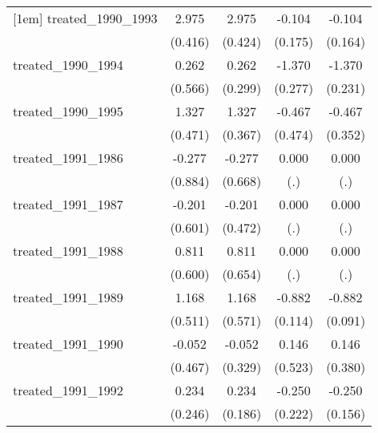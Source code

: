 {\begin{tabular}{l*{4}{c}}
[1em]
treated\_1990\_1993&       2.975\sym{***}&       2.975\sym{***}&      -0.104         &      -0.104         \\
            &     (0.416)         &     (0.424)         &     (0.175)         &     (0.164)         \\
[1em]
treated\_1990\_1994&       0.262         &       0.262         &      -1.370\sym{***}&      -1.370\sym{***}\\
            &     (0.566)         &     (0.299)         &     (0.277)         &     (0.231)         \\
[1em]
treated\_1990\_1995&       1.327\sym{**} &       1.327\sym{***}&      -0.467         &      -0.467         \\
            &     (0.471)         &     (0.367)         &     (0.474)         &     (0.352)         \\
[1em]
treated\_1991\_1986&      -0.277         &      -0.277         &       0.000         &       0.000         \\
            &     (0.884)         &     (0.668)         &         (.)         &         (.)         \\
[1em]
treated\_1991\_1987&      -0.201         &      -0.201         &       0.000         &       0.000         \\
            &     (0.601)         &     (0.472)         &         (.)         &         (.)         \\
[1em]
treated\_1991\_1988&       0.811         &       0.811         &       0.000         &       0.000         \\
            &     (0.600)         &     (0.654)         &         (.)         &         (.)         \\
[1em]
treated\_1991\_1989&       1.168\sym{*}  &       1.168\sym{*}  &      -0.882\sym{***}&      -0.882\sym{***}\\
            &     (0.511)         &     (0.571)         &     (0.114)         &     (0.091)         \\
[1em]
treated\_1991\_1990&      -0.052         &      -0.052         &       0.146         &       0.146         \\
            &     (0.467)         &     (0.329)         &     (0.523)         &     (0.380)         \\
[1em]
treated\_1991\_1992&       0.234         &       0.234         &      -0.250         &      -0.250         \\
            &     (0.246)         &     (0.186)         &     (0.222)         &     (0.156)         \\

\end{tabular}}
